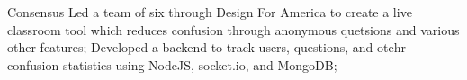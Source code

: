 \project
    {Consensus}
    {
        Led a team of six through Design For America to create a live classroom tool which reduces
        confusion through anonymous quetsions and various other features;
        Developed a backend to track users, questions, and otehr confusion statistics using NodeJS,
        socket.io, and MongoDB;
    }
